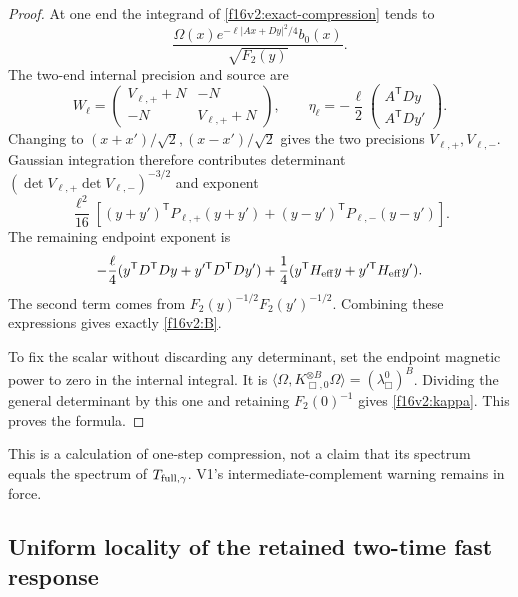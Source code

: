 \documentclass[11pt,oneside]{article}
\begin{document}
\begin{proof}
At one end the integrand of \eqref{f16v2:exact-compression}
tends to
\[
 \frac{\Omega(x)
           e^{-\ell|Ax+Dy|^2/4}b_0(x)}{\sqrt{F_2(y)}} .
\]
The two-end internal precision and source are
\[
 W_\ell=
 \begin{pmatrix}V_{\ell,+}+N&-N\\-N&V_{\ell,+}+N\end{pmatrix},
 \qquad
 \eta_\ell=-\frac\ell2
          \begin{pmatrix}A^{\mathsf T}Dy\\A^{\mathsf T}Dy'\end{pmatrix}.
\]
Changing to \((x+x')/\sqrt2,(x-x')/\sqrt2\) gives the two
precisions \(V_{\ell,+},V_{\ell,-}\). Gaussian integration
therefore contributes determinant
\((\det V_{\ell,+}\det V_{\ell,-})^{-3/2}\)
and exponent
\[
 \frac{\ell^2}{16}\left[
   (y+y')^{\mathsf T}P_{\ell,+}(y+y')
     +(y-y')^{\mathsf T}P_{\ell,-}(y-y')\right].
\]
The remaining endpoint exponent is
\[
 -\frac\ell4(y^{\mathsf T}D^{\mathsf T}Dy
                   +y'^{\mathsf T}D^{\mathsf T}Dy')
 +\frac14(y^{\mathsf T}H_{\rm eff}y
                   +y'^{\mathsf T}H_{\rm eff}y').
\]
The second term comes from \(F_2(y)^{-1/2}F_2(y')^{-1/2}\).
Combining these expressions gives exactly \eqref{f16v2:B}.

To fix the scalar without discarding any determinant, set the
endpoint magnetic power to zero in the internal integral.
It is \(\langle\Omega,K_{\Box,0}^{\otimes B}\Omega\rangle
=(\lambda_\Box^0)^B\). Dividing the general determinant by
this one and retaining \(F_2(0)^{-1}\) gives
\eqref{f16v2:kappa}. This proves the formula.
\end{proof}

This is a calculation of one-step compression, not a claim that
its spectrum equals the spectrum of \(T_{\rm full,\gamma}\).
V1's intermediate-complement warning remains in force.

\subsection{Uniform locality of the retained two-time fast response}
\end{document}
